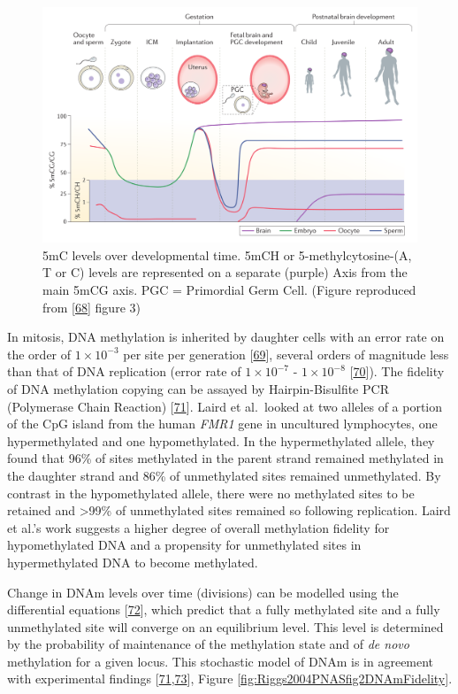 \documentclass[
]{book}
\begin{document}
\begin{figure}

{\centering \includegraphics[width=0.8\linewidth]{figs/Ciernia2016f3DNAmTime} 

}

\caption{5mC levels over developmental time. 5mCH or 5-methylcytosine-(A, T or C) levels are represented on a separate (purple) Axis from the main 5mCG axis. PGC = Primordial Germ Cell. (Figure reproduced from {[}\protect\hyperlink{ref-Ciernia2016}{68}{]} figure 3)}\label{fig:DNAmDevTime}
\end{figure}



In mitosis, DNA methylation is inherited by daughter cells with an error rate on the order of \(1\times10^{-3}\) per site per generation {[}\protect\hyperlink{ref-Ushijima2005}{69}{]}, several orders of magnitude less than that of DNA replication (error rate of \(1\times10^{-7}\) - \(1\times10^{-8}\) {[}\protect\hyperlink{ref-Kunkel2004a}{70}{]}).
The fidelity of DNA methylation copying can be assayed by Hairpin-Bisulfite PCR (Polymerase Chain Reaction) {[}\protect\hyperlink{ref-Laird2004}{71}{]}.
Laird et al.~looked at two alleles of a portion of the CpG island from the human \emph{FMR1} gene in uncultured lymphocytes, one hypermethylated and one hypomethylated.
In the hypermethylated allele, they found that 96\% of sites methylated in the parent strand remained methylated in the daughter strand and 86\% of unmethylated sites remained unmethylated.
By contrast in the hypomethylated allele, there were no methylated sites to be retained and \textgreater99\% of unmethylated sites remained so following replication.
Laird et al.'s work suggests a higher degree of overall methylation fidelity for hypomethylated DNA and a propensity for unmethylated sites in hypermethylated DNA to become methylated.

Change in DNAm levels over time (divisions) can be modelled using the differential equations {[}\protect\hyperlink{ref-Pfeifer1990a}{72}{]}, which predict that a fully methylated site and a fully unmethylated site will converge on an equilibrium level.
This level is determined by the probability of maintenance of the methylation state and of \emph{de novo} methylation for a given locus.
This stochastic model of DNAm is in agreement with experimental findings {[}\protect\hyperlink{ref-Laird2004}{71},\protect\hyperlink{ref-Riggs2004a}{73}{]}, Figure \ref{fig:Riggs2004PNASfig2DNAmFidelity}.
\end{document}

